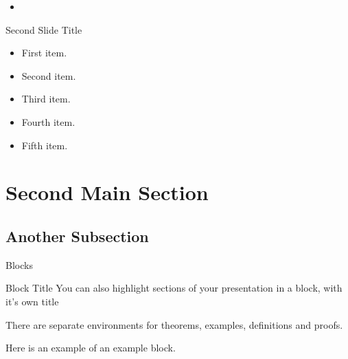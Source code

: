 \documentclass{beamer}
\begin{document}
\begin{frame}
	\begin{itemize}
		\item 
	\end{itemize}
\end{frame} 
\begin{frame}{Second Slide Title}
  \begin{itemize}
  \item {
    First item.
    \pause %
  }
  \item {   
    Second item.
  }
  \item<3-> {
    Third item.
  }  
  \item<4-> {
    Fourth item.
  }
  \item<5-> {
    Fifth item. 
  }
  \end{itemize}
\end{frame}

\section{Second Main Section}

\subsection{Another Subsection}

\begin{frame}{Blocks}
\begin{block}{Block Title}
You can also highlight sections of your presentation in a block, with it's own title
\end{block}
\begin{theorem}
There are separate environments for theorems, examples, definitions and proofs.
\end{theorem}
\begin{example}
Here is an example of an example block.
\end{example}
\end{frame}

\end{document}
